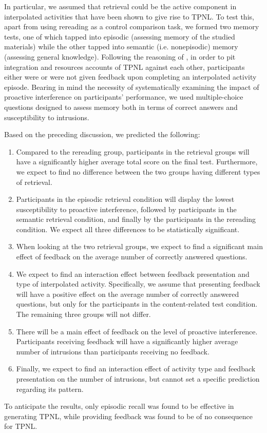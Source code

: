 \documentclass[../main.tex]{subfiles}
\begin{document}
In particular, we assumed that retrieval could be the active component in
interpolated activities that have been shown to give rise to TPNL. To test this,
apart from using rereading as a control comparison task,
we formed two memory tests, one of which tapped into episodic
(assessing memory of the studied materials) while the other tapped into semantic
(i.e. nonepisodic) memory (assessing general knowledge). Following the 
reasoning of \cite{chanRetrievalPotentiatesNew2018}, in order to
pit integration and resources accounts of TPNL against each other, participants 
either were or were not given feedback upon completing an interpolated activity 
episode. Bearing in mind the necessity of systematically examining the impact of 
proactive interference on participants' performance, we used multiple-choice questions
designed to assess memory both in terms of correct answers and susceptibility
to intrusions.

Based on the preceding discussion, we predicted the following:
\begin{enumerate}[label = H\arabic*:, ref = hypothesis \arabic*]
    \itemsep0pt
    \item\label{h1} Compared to the rereading group, participants in the retrieval groups
        will have a significantly higher average total score on the final
        test. Furthermore, we expect to find no difference between the two
        groups having different types of retrieval.
    \item\label{h2} Participants in the episodic retrieval condition will display
    	the lowest susceptibility to proactive interference, followed by participants
        in the semantic retrieval condition, and finally by the participants in
        the rereading condition. We expect all three differences to be
        statistically significant.
    \item\label{h3} When looking at the two retrieval groups, we
        expect to find a significant main effect of feedback on the average
        number of correctly answered questions.
    \item\label{h4} We expect to find an interaction effect between feedback
        presentation and type of interpolated activity. Specifically, we assume
        that presenting feedback will have a positive effect on the average
        number of correctly answered questions, but only for the participants in
        the content-related test condition. The remaining three groups will not
        differ.
    \item\label{h5} There will be a main effect of feedback on the level of
    	proactive interference. Participants receiving feedback will have
        a significantly higher average number of intrusions
        than participants receiving no feedback.
    \item\label{h6} Finally, we expect to find an interaction effect of activity
    	type and feedback presentation on the number of intrusions, but
        cannot set a specific prediction regarding its pattern.

\end{enumerate}  

\noindent To anticipate the results, only episodic recall was found to be effective in 
generating TPNL, while providing feedback was found to be of no consequence for TPNL.


 
{
	\biblio
}
\end{document}
